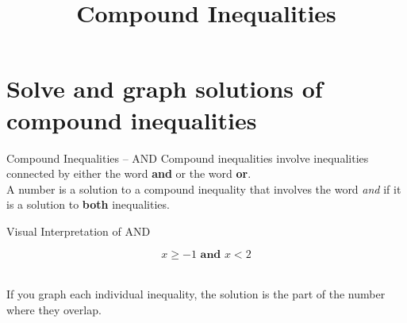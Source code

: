 \documentclass[t]{beamer}
\title{Compound Inequalities}
\author{}
\date{}
\begin{document}
\begin{frame} 
\maketitle
\end{frame}

\section{Solve and graph solutions of compound inequalities}

\begin{frame}{Compound Inequalities -- AND}
	Compound inequalities involve inequalities connected by either the word {\color{blue}\textbf{and}} or the word {\color{red}\textbf{or}}.	\newline\\	\pause
	A number is a solution to a compound inequality that involves the word \emph{and} if it is a solution to \textbf{both} inequalities.
\end{frame}

\begin{frame}{Visual Interpretation of AND}
	\begin{center}
		\[x \geq -1 \textbf{ and } x < 2\]
			\newline\\
		If you graph each individual inequality, the solution is the part of the number where they overlap.
	\end{center}
\end{frame}
\end{document}
